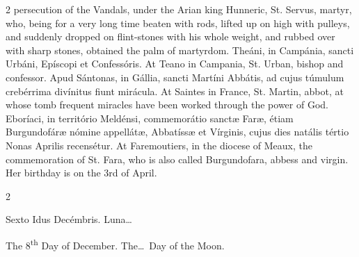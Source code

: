 \begin{paracol}{2}
 persecution of the Vandals, under the Arian king Hunneric, St. Servus, 
 martyr, who, being for a very long time beaten with rods, lifted up on high 
 with pulleys, and suddenly dropped on flint-stones with his whole weight, 
 and rubbed over with sharp stones, obtained the palm of martyrdom.
\switchcolumn*
{}
Theáni, in Campánia, sancti Urbáni, Epíscopi et Confessóris.
\switchcolumn
{}
At Teano in Campania, St. Urban, 
 bishop and confessor.
\switchcolumn*
{}
Apud Sántonas, in 
 Gállia, sancti Martíni Abbátis, ad cujus túmulum crebérrima divínitus fiunt 
 mirácula.
\switchcolumn
{}
At Saintes in France, St. Martin, 
 abbot, at whose tomb frequent miracles have been worked through the power of 
 God.
\switchcolumn*
{}
Eboríaci, in território 
 Meldénsi, commemorátio sanctæ Faræ, étiam Burgundofáræ nómine appellátæ, 
 Abbatíssæ et Vírginis, cujus dies natális tértio Nonas Aprilis recensétur.
\switchcolumn
{}
At Faremoutiers, in the diocese of 
 Meaux, the commemoration of St. Fara, who is also called Burgundofara, 
 abbess and virgin. Her birthday is on the 3rd of April.
\switchcolumn*
{}
\end{paracol}


\begin{paracol}{2}
\begin{center}{\color{gregoriocolor} Sexto Idus Decémbris. 
 Luna\dots\ }\end{center}
\switchcolumn
{}
\begin{center}{\color{gregoriocolor} The 
 8\textsuperscript{th} Day of 
 December. The\dots\ Day of the Moon.}\end{center}
\end{paracol}

